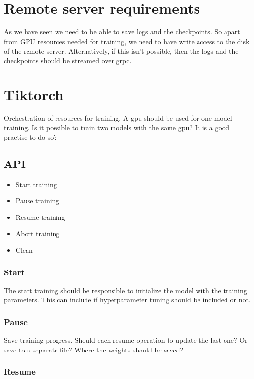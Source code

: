 \documentclass[12pt, a4paper]{article}
\begin{document}
\section{Remote server requirements}

As we have seen we need to be able to save logs and the checkpoints. So apart from GPU resources needed for training, we need to have write access to the disk of the remote server. Alternatively, if this isn't possible, then the logs and the checkpoints should be streamed over grpc.

\section{Tiktorch}

Orchestration of resources for training. A gpu should be used for one model training. Is it possible to train two models with the same gpu? It is a good practise to do so?

\subsection{API}

\begin{itemize}
    \item Start training
    \item Pause training
    \item Resume training
    \item Abort training
    \item Clean
\end{itemize}

\subsubsection{Start}

The start training should be responsible to initialize the model with the training parameters. This can include if hyperparameter tuning should be included or not.

\subsubsection{Pause}

Save training progress. Should each resume operation to update the last one? Or save to a separate file? Where the weights should be saved?

\subsubsection{Resume}
\end{document}
